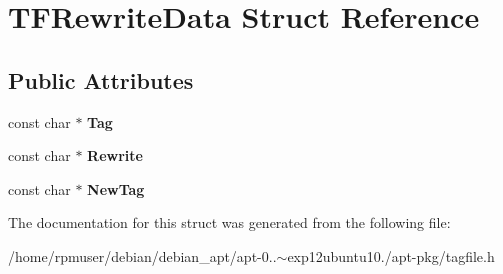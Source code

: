 \section{\-T\-F\-Rewrite\-Data \-Struct \-Reference}
\label{structTFRewriteData}
\subsection*{\-Public \-Attributes}
\begin{DoxyCompactItemize}
\item 
const char $\ast$ {\bfseries \-Tag}\label{structTFRewriteData_a7e60713be34e97c29537fa19e023fdd8}

\item 
const char $\ast$ {\bfseries \-Rewrite}\label{structTFRewriteData_ae040c4b6148e065246afadf07e10162b}

\item 
const char $\ast$ {\bfseries \-New\-Tag}\label{structTFRewriteData_aca62e38c39240203b8f45732e77d3f93}

\end{DoxyCompactItemize}


\-The documentation for this struct was generated from the following file\-:\begin{DoxyCompactItemize}
\item 
/home/rpmuser/debian/debian\-\_\-apt/apt-\/0..$\sim$exp12ubuntu10./apt-\/pkg/tagfile.\-h\end{DoxyCompactItemize}
